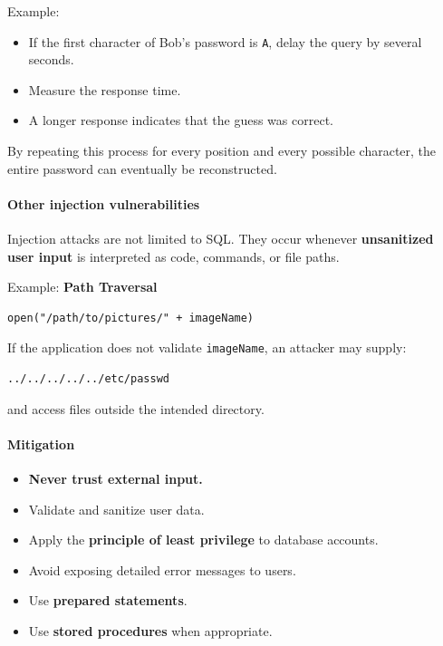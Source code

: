 Example:

\begin{itemize}
    \item If the first character of Bob's password is \texttt{A}, delay the query by several seconds.
    \item Measure the response time.
    \item A longer response indicates that the guess was correct.
\end{itemize}

By repeating this process for every position and every possible character, the entire password can eventually be reconstructed.

\paragraph{Other injection vulnerabilities}

Injection attacks are not limited to SQL. They occur whenever \textbf{unsanitized user input} is interpreted as code, commands, or file paths.

\vspace{0.3em}

Example: \textbf{Path Traversal}

\begin{lstlisting}
open("/path/to/pictures/" + imageName)
\end{lstlisting}

If the application does not validate \texttt{imageName}, an attacker may supply:

\begin{lstlisting}
../../../../../etc/passwd
\end{lstlisting}

and access files outside the intended directory.

\paragraph{Mitigation}

\begin{itemize}
    \item \textbf{Never trust external input.}
    \item Validate and sanitize user data.
    \item Apply the \textbf{principle of least privilege} to database accounts.
    \item Avoid exposing detailed error messages to users.
    \item Use \textbf{prepared statements}.
    \item Use \textbf{stored procedures} when appropriate.
\end{itemize}

